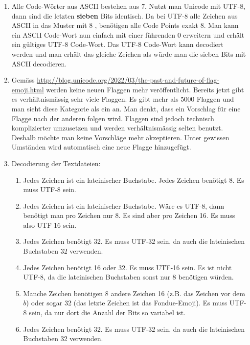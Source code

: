 \begin{enumerate}
\item Alle Code-Wörter aus \ac{ASCII} bestehen aus \qty{7}{\bit}. Nutzt man Unicode mit UTF-8, dann sind die letzten \textbf{sieben} Bits identisch. Da bei UTF-8 alle Zeichen aus \ac{ASCII} in das Muster mit \qty{8}{\bit} , benötigen alle Code Points exakt \qty{8}{\bit}. Man kann ein \ac{ASCII} Code-Wort nun einfach mit einer führenden \num{0} erweitern und erhält ein gültiges UTF-8 Code-Wort. Das UTF-8 Code-Wort kann decodiert werden und man erhält das gleiche Zeichen als würde man die sieben Bits mit \ac{ASCII} decodieren.
\item Gemäss \url{http://blog.unicode.org/2022/03/the-past-and-future-of-flag-emoji.html} werden keine neuen Flaggen mehr veröffentlicht. Bereits jetzt gibt es verhältnismässig sehr viele Flaggen. Es gibt mehr als \num{5000} Flaggen und man sieht diese Kategorie als ein  an. Man denkt, dass ein Vorschlag für eine Flagge nach der anderen folgen wird. Flaggen sind jedoch technisch komplizierter umzusetzen und werden verhältnismässig selten benutzt. Deshalb möchte man keine Vorschläge mehr akzeptieren. Unter gewissen Umständen wird automatisch eine neue Flagge hinzugefügt.
\item Decodierung der Textdateien:
\begin{enumerate}
\item Jedes Zeichen ist ein lateinischer Buchstabe. Jedes Zeichen benötigt \qty{8}{\bit}. Es muss UTF-8 sein.
\item Jedes Zeichen ist ein lateinischer Buchstabe. Wäre es UTF-8, dann benötigt man pro Zeichen nur \qty{8}{\bit}. Es sind aber pro Zeichen \qty{16}{\bit}. Es muss also UTF-16 sein.
\item Jedes Zeichen benötigt \qty{32}{\bit}. Es muss UTF-32 sein, da auch die lateinischen Buchstaben \qty{32}{\bit} verwenden.
\item Jedes Zeichen benötigt \qty{16}{\bit} oder \qty{32}{\bit}. Es muss UTF-16 sein. Es ist nicht UTF-8, da die lateinischen Buchstaben sonst nur \qty{8}{\bit} benötigen würden.
\item Manche Zeichen benötigen \qty{8}{\bit} andere Zeichen \qty{16}{\bit} (z.B. das Zeichen vor dem $b$) oder sogar \qty{32}{\bit} (das letzte Zeichen ist das Fondue-Emoji). Es muss UTF-8 sein, da nur dort die Anzahl der Bits so variabel ist.
\item Jedes Zeichen benötigt \qty{32}{\bit}. Es muss UTF-32 sein, da auch die lateinischen Buchstaben \qty{32}{\bit} verwenden.
\end{enumerate}
\end{enumerate}

